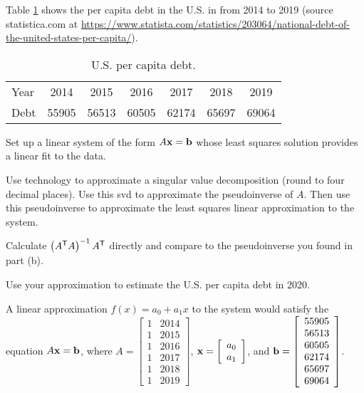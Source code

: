 \begin{example} Table \ref{T:Debt_per_capita} shows the per capita debt in the U.S. in from 2014 to 2019 (source statistica.com at \url{https://www.statista.com/statistics/203064/national-debt-of-the-united-states-per-capita/}). 

\begin{table}[ht]
\begin{center}
\begin{tabular}{l|cccccc}
Year	&2014	&2015	&2016	&2017	&2018	&2019 \\
Debt	&55905	&56513	&60505	&62174	&65697	&69064 
\end{tabular}
\caption{U.S. per capita debt.}
\label{T:Debt_per_capita}
\end{center}
\end{table}

\ba
\item Set up a linear system of the form $A \mathbf{x} = \mathbf{b}$ whose least squares solution provides a linear fit to the data. 

\item Use technology to approximate a singular value decomposition (round to four decimal places). Use this svd to approximate the pseudoinverse of $A$. Then use this pseudoinverse to approximate the least squares linear approximation to the system.

\item Calculate $\left(A^{\mathsf{T}}A\right)^{-1}A^{\mathsf{T}}$ directly and compare to the pseudoinverse you found in part (b). 

\item Use your approximation to estimate the U.S. per capita debt in 2020. 

\ea

\ExampleSolution

\ba
\item A linear approximation $f(x) = a_0 + a_1x$ to the system would satisfy the equation $A \mathbf{x} = \mathbf{b}$, where $A = \left[ \begin{array}{cc} 1&2014 \\ 1&2015 \\ 1&2016 \\ 1&2017 \\ 1&2018 \\ 1&2019 \end{array} \right]$, $\mathbf{x} = \left[ \begin{array}{c} a_0 \\ a_1 \end{array} \right]$, and $\mathbf{b} = \left[ \begin{array}{c}  55905 \\ 56513	\\ 60505 \\ 62174 \\ 65697 \\ 69064 \end{array} \right]$. 


\end{example}
